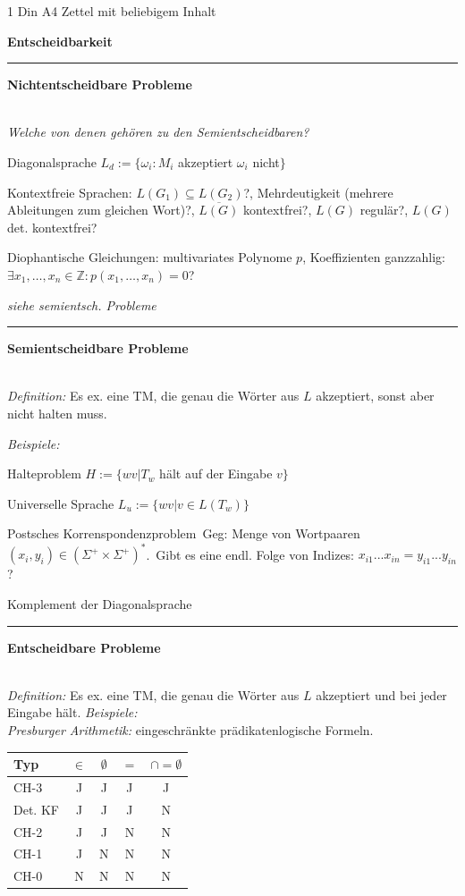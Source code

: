 \documentclass{article}
\newcommand{\h}[1]{\vspace{1ex}\begin{center}\small\textbf{#1}\end{center}}
\newcommand{\hh}[1]{{\vspace{1pt}\hrule\vspace{1pt} \noindent\textbf{#1}}\\}
\newcommand{\hhh}[1]{{\vspace{1pt}\noindent\emph{#1:}}}
\newenvironment{tightlist}{
\begin{list}{\textbullet}{
\setlength{\topsep}{-1ex}
\setlength{\itemsep}{-1ex}
\setlength{\leftmargin}{4ex}
}
}{
\end{list}
\vspace{1ex}
}
\newcommand{\FM}[1]{{\color{red}\emph{#1}}}
\begin{document}
\begin{center} 1 Din A4 Zettel mit beliebigem Inhalt\end{center}

\begin{multicols}{4}
\scriptsize\raggedright

\setlength{\parskip}{0pt}

\h{Entscheidbarkeit}
\hh{Nichtentscheidbare Probleme}
\FM{Welche von denen gehören zu den Semientscheidbaren?}
\begin{tightlist}
\item Diagonalsprache
	$L_d:=\{\omega_i: M_i$ akzeptiert $\omega_i$ nicht$\}$
\item Kontextfreie Sprachen:
$L(G_1) \subseteq L(G_2)$?,
Mehrdeutigkeit (mehrere Ableitungen zum gleichen Wort)?,
$\overline{L(G)}$ kontextfrei?,
$L(G)$ regulär?,
$L(G)$ det. kontextfrei?
\item Diophantische Gleichungen: multivariates Polynome $p$, Koeffizienten ganzzahlig: $\exists x_1, \ldots, x_n\in\mathbb{Z}:p(x_1, \ldots, x_n)=0$?
\item \emph{siehe semientsch. Probleme}
\end{tightlist}


\hh{Semientscheidbare Probleme}
\hhh{Definition} Es ex. eine TM, die genau die Wörter aus $L$ akzeptiert, sonst aber nicht halten muss.

\hhh{Beispiele}
\begin{tightlist}
\item Halteproblem 
	$H:=\{wv | T_w$ hält auf der Eingabe $v\}$
\item Universelle Sprache
	$L_u:=\{wv| v\in L(T_w)\}$
\item Postsches Korrenspondenzproblem\ Geg: Menge von Wortpaaren $(x_i , y_i) \in (\Sigma^+ \times \Sigma^+)^*$.\ Gibt es eine endl. Folge von Indizes: $x_{i1} ... x_{in}=y_{i1}... y_{in}$?
\item Komplement der Diagonalsprache
\end{tightlist}


\hh{Entscheidbare Probleme}
\hhh{Definition} Es ex. eine TM, die genau die Wörter aus $L$ akzeptiert und bei jeder Eingabe hält.
\hhh{Beispiele}\\
\hhh{Presburger Arithmetik} eingeschränkte prädikatenlogische Formeln.\\
\begin{tabular}{l|c|c|c|c}
Typ & $\in$ & $\emptyset$ & $=$ &$\cap=\emptyset$ \\
\hline
CH-3 & J & J & J & J \\
Det. KF & J & J & J & N \\
CH-2& J & J & N & N \\
CH-1& J & N & N & N \\
CH-0& N & N & N & N  
\end{tabular}



\end{multicols}
\end{document}
